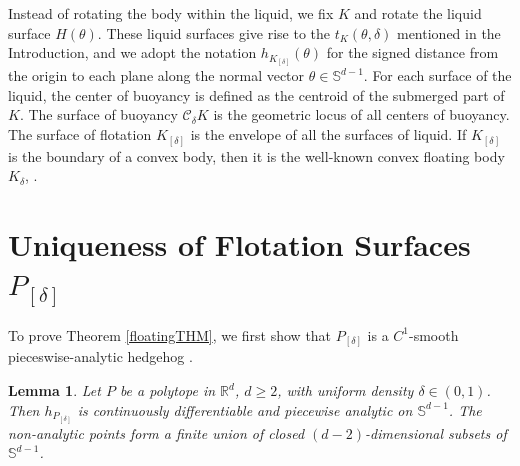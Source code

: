 \documentclass[12pt,letterpaper,reqno]{amsart}
\newtheorem{lemma}{Lemma}
\begin{document}
Instead of rotating the body within the liquid, we fix $K$ and rotate the liquid surface $H(\theta)$. These liquid surfaces give rise to the $t_K(\theta, \delta)$ mentioned in the Introduction, and we adopt the notation $h_{K_{[\delta]}}(\theta)$ for the signed distance from the origin to each plane along the normal vector $\theta \in \mathbb{S}^{d-1}$. For each surface of the liquid, the center of buoyancy is defined as the centroid of the
submerged part of $K$. The surface of buoyancy $\mathcal{C}_\delta K$ is the geometric locus of all centers of buoyancy. The surface of flotation $K_{[\delta]}$ is the envelope of all the surfaces of liquid. If $K_{[\delta]}$ is the boundary of a convex body, then it is the well-known convex floating body $K_\delta$, \cite{W}.




\section{Uniqueness of Flotation Surfaces $P_{[\delta]}$}
To prove Theorem \ref{floatingTHM}, we first show that $P_{[\delta]}$ is a $C^1$-smooth pieceswise-analytic hedgehog \cite{MM}.
\begin{lemma}\label{hedgehog}
Let $P$ be a polytope in $\mathbb{R}^d$, $d \geq 2$, with uniform density $\delta \in (0,1)$. 
Then $h_{P_{[\delta]}}$ is continuously differentiable and piecewise analytic on $\mathbb{S}^{d-1}$. 
The non-analytic points form a finite union of closed $(d-2)$-dimensional subsets of $\mathbb{S}^{d-1}$.
\end{lemma}
\end{document}

